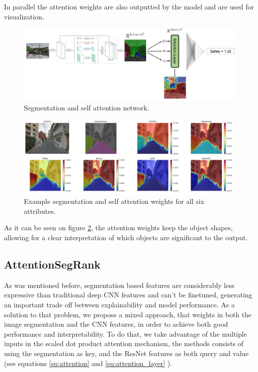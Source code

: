 In parallel the attention weights are also outputted by the model and are used for visualization.

\begin{figure}[ht]
	\begin{center}
	\includegraphics[width=1\textwidth]{./figures/self_attn.png}
	\caption[Self Attention network]{Segmentation and self attention network.}
	\label{fig:segrank_1}
	\end{center}
\end{figure}

\begin{figure}[ht]
	\begin{center}
	\includegraphics[width=1\textwidth]{./figures/self_attn_vis.png}
	\caption[Self Attention Model output]{Example segmentation and self attention weights for all six attributes.}
	\label{fig:segrank_attention}
	\end{center}
\end{figure}

As it can be seen on figure \ref{fig:segrank_attention}, the attention weights keep the object shapes,
allowing for a clear interpretation of which objects are significant to the output.

\subsection{AttentionSegRank}
As was mentioned before, segmentation based features are considerably less expressive than
traditional deep CNN features and can't be finetuned, generating an important trade off between explainability and model performance.
As a solution to that problem, we propose a mixed approach, that weights in both the image segmentation
and the CNN features, in order to achieve both good performance and interpretability. To do that,
we take advantage of the multiple inputs in the scaled dot product attention mechanism, the methods consists
of using the segmentation as key, and the ResNet features as both query and value (see equations \ref{eq:attention} and \ref{eq:attention_layer} ).

